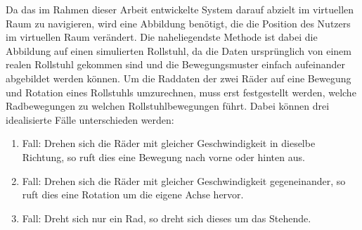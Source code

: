 Da das im Rahmen dieser Arbeit entwickelte System darauf abzielt im
virtuellen Raum zu navigieren, wird eine Abbildung benötigt, die die
Position des Nutzers im virtuellen Raum verändert. Die naheliegendste
Methode ist dabei die Abbildung auf einen simulierten Rollstuhl, da die
Daten ursprünglich von einem realen Rollstuhl gekommen sind und die
Bewegungsmuster einfach aufeinander abgebildet werden können. Um die
Raddaten der zwei Räder auf eine Bewegung und Rotation eines Rollstuhls
umzurechnen, muss erst festgestellt werden, welche Radbewegungen zu
welchen Rollstuhlbewegungen führt. Dabei können drei idealisierte Fälle
unterschieden werden:

\begin{enumerate}
\def\labelenumi{\arabic{enumi}.}
\tightlist
\item
  Fall: Drehen sich die Räder mit gleicher Geschwindigkeit in dieselbe
  Richtung, so ruft dies eine Bewegung nach vorne oder hinten aus.
\item
  Fall: Drehen sich die Räder mit gleicher Geschwindigkeit
  gegeneinander, so ruft dies eine Rotation um die eigene Achse hervor.
\item
  Fall: Dreht sich nur ein Rad, so dreht sich dieses um das Stehende.
\end{enumerate}

